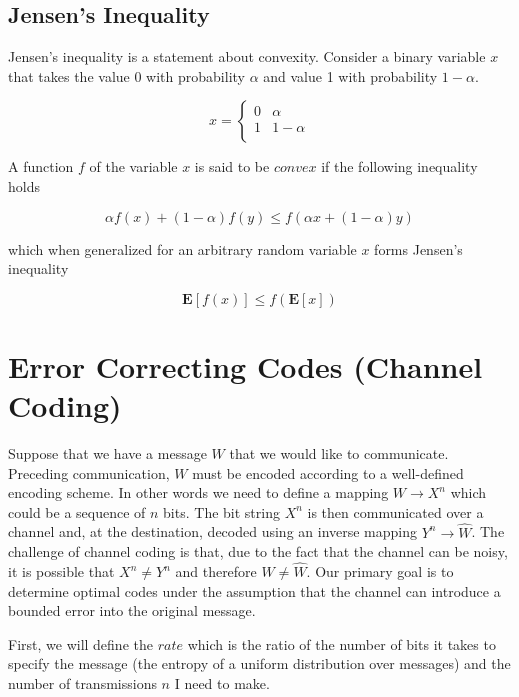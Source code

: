 \documentclass[a4paper,11pt]{book}
\begin{document}
\subsection{Jensen's Inequality}

Jensen's inequality is a statement about convexity. Consider a binary variable $x$ that takes the value 0 with probability $\alpha$ and value 1 with probability $1-\alpha$.

\[x= \begin{cases} 
      0 & \alpha \\
      1 & 1-\alpha \\
   \end{cases}
\]

A function $f$ of the variable $x$ is said to be $\textit{convex}$ if the following inequality holds

\begin{equation*}
\alpha f(x) + (1-\alpha)f(y) \leq f(\alpha x + (1-\alpha)y)
\end{equation*}

which when generalized for an arbitrary random variable $x$ forms Jensen's inequality

\begin{equation}
\mathbf{E}[f(x)] \leq f(\mathbf{E}[x])
\end{equation}

\section{Error Correcting Codes (Channel Coding)}

Suppose that we have a message $W$ that we would like to communicate. Preceding communication, $W$ must be encoded according to a well-defined encoding scheme. In other words we need to define a mapping $W \rightarrow X^{n}$ which could be a sequence of $n$ bits. The bit string $X^{n}$ is then communicated over a channel and, at the destination, decoded using an inverse mapping $Y^{n} \rightarrow \hat{W}$. The challenge of channel coding is that, due to the fact that the channel can be noisy, it is possible that $X^{n} \neq Y^{n}$ and therefore $W \neq \hat{W}$. Our primary goal is to determine optimal codes under the assumption that the channel can introduce a bounded error into the original message. 

First, we will define the $rate$ which is the ratio of the number of bits it takes to specify the message (the entropy of a uniform distribution over messages) and the number of transmissions $n$ I need to make.
\end{document}
